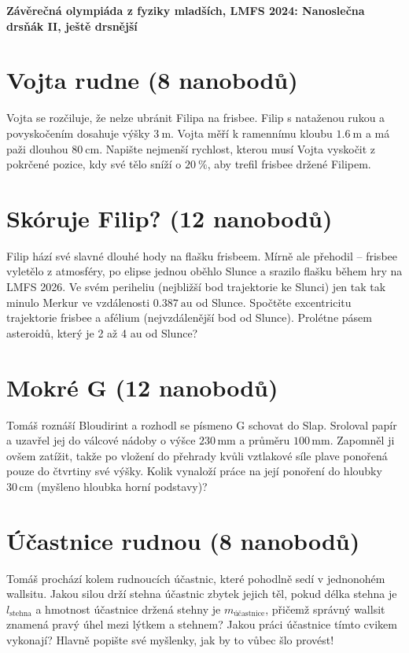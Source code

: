 \documentclass[10pt,a4paper,landscape]{article}
\author{Tomáš Dolák}
\begin{document}
\pagestyle{empty}
	\textbf{\center\LARGE Závěrečná olympiáda z fyziky mladších, LMFS 2024: Nanoslečna drsňák II, ještě drsnější}
\vfill

\begin{multicols}{2}[]

\section{Vojta rudne (8 nanobodů)}
Vojta se rozčiluje, že nelze ubránit Filipa na frisbee. Filip s nataženou rukou a povyskočením dosahuje výšky $3~\mathrm{m}$. Vojta měří k ramennímu kloubu $1.6~\mathrm{m}$ a má paži dlouhou $80~\mathrm{cm}$. Napište nejmenší rychlost, kterou musí Vojta vyskočit z pokrčené pozice, kdy své tělo sníží o $20~\%$, aby trefil frisbee držené Filipem.

\section{Skóruje Filip? (12 nanobodů)}
Filip hází své slavné dlouhé hody na flašku frisbeem. Mírně ale přehodil -- frisbee vyletělo z atmosféry, po elipse jednou oběhlo Slunce a srazilo flašku během hry na LMFS 2026. Ve svém periheliu (nejbližší bod trajektorie ke Slunci) jen tak tak minulo Merkur ve vzdálenosti $0.387~\mathrm{au}$ od Slunce. Spočtěte excentricitu trajektorie frisbee a afélium (nejvzdálenější bod od Slunce). Prolétne pásem asteroidů, který je 2 až 4 au od Slunce?



\section{Mokré G (12 nanobodů)}
Tomáš roznáší Bloudirint a rozhodl se písmeno G schovat do Slap. Sroloval papír a uzavřel jej do válcové nádoby o výšce $230\,\mathrm{mm}$ a průměru $100\,\mathrm{mm}$. Zapomněl ji ovšem zatížit, takže po vložení do přehrady kvůli vztlakové síle plave ponořená pouze do čtvrtiny své výšky. Kolik vynaloží práce na její ponoření do hloubky $30\,\mathrm{cm}$ (myšleno hloubka horní podstavy)?

\section{Účastnice rudnou (8 nanobodů)}
Tomáš prochází kolem rudnoucích účastnic, které pohodlně sedí v jednonohém wallsitu. Jakou silou drží stehna účastnic zbytek jejich těl, pokud délka stehna je $l_\text{stehna}$ a hmotnost účastnice držená stehny je $m_\text{účastnice}$, přičemž správný wallsit znamená pravý úhel mezi lýtkem a stehnem? Jakou práci účastnice tímto cvikem vykonají? Hlavně popište své myšlenky, jak by to vůbec šlo provést!


\end{multicols}
\end{document}
